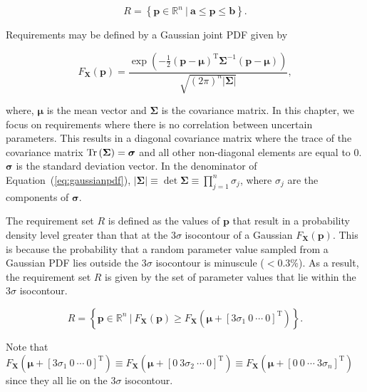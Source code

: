 \begin{equation} \label{eq:requirementsetuniform}
	\textit{R} = \left\{\mathbf{p} \in \mathbb{R}^n~|~\mathbf{a}\leq \mathbf{p}\leq \mathbf{b}\right\}.
\end{equation}

Requirements may be defined by a Gaussian joint \ac{PDF} given by

\begin{equation} \label{eq:gaussianpdf}
	F_\mathbf{X}(\mathbf{p})={\frac {\exp \left(-{\frac {1}{2}}({\mathbf {p} }-{\boldsymbol {\mu }})^{\mathrm {T} }{\boldsymbol {\Sigma }}^{-1}({\mathbf {p} }-{\boldsymbol {\mu }})\right)}{\sqrt {(2\pi )^{n}|{\boldsymbol {\Sigma }}|}}},
\end{equation}

where, $\boldsymbol{\mu}$ is the mean vector and $\boldsymbol{\Sigma}$ is the covariance matrix. In this chapter, we focus on requirements where there is no correlation between uncertain parameters. This results in a diagonal covariance matrix where the trace of the covariance matrix $\operatorname{Tr}\left(\boldsymbol{\Sigma}\right) = \boldsymbol{\sigma}$ and all other non-diagonal elements are equal to 0. $\boldsymbol{\sigma}$ is the standard deviation vector. In the denominator of Equation~(\ref{eq:gaussianpdf}), $|{\boldsymbol {\Sigma }}|\equiv \det {\boldsymbol {\Sigma }} \equiv \prod\limits_{j=1}^{n} \sigma_j$, where $\sigma_j$ are the components of $\boldsymbol{\sigma}$.

The requirement set $R$ is defined as the values of $\mathbf{p}$ that result in a probability density level greater than that at the $3{\sigma}$ isocontour of a Gaussian $F_\mathbf{X}(\mathbf{p})$. This is because the probability that a random parameter value sampled from a Gaussian \ac{PDF} lies outside the $3{\sigma}$ isocontour is minuscule ($<0.3\%$). As a result, the requirement set $R$ is given by the set of parameter values that lie within the $3\sigma$ isocontour.

\begin{equation} \label{eq:requirementsetgaussian}
	\textit{R} = \left\{\mathbf{p} \in \mathbb{R}^n~|~F_\mathbf{X}(\mathbf{p}) \geq F_\mathbf{X}(\boldsymbol{\mu} + \left[3\sigma_1~0~\cdots~0\right]^\mathrm{T}) \right\}.
\end{equation}

Note that $F_\mathbf{X}(\boldsymbol{\mu} + \left[3\sigma_1~0~\cdots~0\right]^\mathrm{T}) \equiv F_\mathbf{X}(\boldsymbol{\mu} + \left[0~3\sigma_2~\cdots~0\right]^\mathrm{T}) \equiv F_\mathbf{X}(\boldsymbol{\mu} + \left[0~0~\cdots~3\sigma_n\right]^\mathrm{T})$ since they all lie on the $3\sigma$ isocontour.

